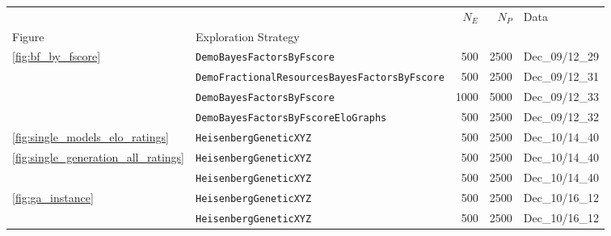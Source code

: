 \begin{tabular}{llrrl}
\hline
                        &                                                      &                                    $N_E$ &                                    $N_P$ &                                     Data \\
Figure & Exploration Strategy &                                          &                                          &                                          \\
\midrule
\multirow{4}{*}{\cref{fig:bf_by_fscore}} & \texttt{DemoBayesFactorsByFscore} &                                      500 &                                     2500 &                           Dec\_09/12\_29 \\
                        & \texttt{DemoFractionalResourcesBayesFactorsByFscore} &                                      500 &                                     2500 &                           Dec\_09/12\_31 \\
                        & \texttt{DemoBayesFactorsByFscore} &                                     1000 &                                     5000 &                           Dec\_09/12\_33 \\
                        & \texttt{DemoBayesFactorsByFscoreEloGraphs} &                                      500 &                                     2500 &                           Dec\_09/12\_32 \\
\cline{1-5}
\cref{fig:single_models_elo_ratings} & \texttt{HeisenbergGeneticXYZ} &                                      500 &                                     2500 &                           Dec\_10/14\_40 \\
\multirow{2}{*}{\cref{fig:single_generation_all_ratings}} & \texttt{HeisenbergGeneticXYZ} &                                      500 &                                     2500 &                           Dec\_10/14\_40 \\
                        & \texttt{HeisenbergGeneticXYZ} &                                      500 &                                     2500 &                           Dec\_10/14\_40 \\
\cline{1-5}
\multirow{2}{*}{\cref{fig:ga_instance}} & \texttt{HeisenbergGeneticXYZ} &                                      500 &                                     2500 &                           Dec\_10/16\_12 \\
                        & \texttt{HeisenbergGeneticXYZ} &                                      500 &                                     2500 &                           Dec\_10/16\_12 \\

\end{tabular}

